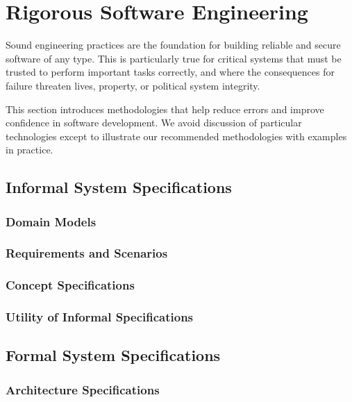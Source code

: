 \chapter{Rigorous Software Engineering}
\label{cha:rigor-softw-engin}

Sound engineering practices are the foundation for building reliable
and secure software of any type. This is particularly true for
critical systems that must be trusted to perform important tasks
correctly, and where the consequences for failure threaten lives,
property, or political system integrity.

This section introduces methodologies that help reduce errors and
improve confidence in software development. We avoid discussion of
particular technologies except to illustrate our recommended
methodologies with examples in practice.

\section{Informal System Specifications}

\subsection{Domain Models}

\subsection{Requirements and Scenarios}


\subsection{Concept Specifications}

\subsection{Utility of Informal Specifications}

\section{Formal System Specifications}

\subsection{Architecture Specifications}


